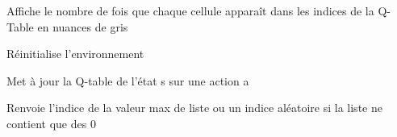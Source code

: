 \documentclass[letterpaper,10pt,french]{sphinxmanual}
\begin{document}
\begin{fulllineitems}
\begin{fulllineitems}
\label{\detokenize{index:qRL_optimizer.QRLOptimizer.printQIndexes}}
Affiche le nombre de fois que chaque cellule apparaît dans
les indices de la Q-Table en nuances de gris

\end{fulllineitems}


\begin{fulllineitems}
\label{\detokenize{index:qRL_optimizer.QRLOptimizer.reinit}}
Réinitialise l’environnement

\end{fulllineitems}


\begin{fulllineitems}
\label{\detokenize{index:qRL_optimizer.QRLOptimizer.update}}
Met à jour la Q-table de l’état s sur une action a

\end{fulllineitems}


\end{fulllineitems}


\begin{fulllineitems}
\label{\detokenize{index:qRL_optimizer.argmax}}
Renvoie l’indice de la valeur max de liste
ou un indice aléatoire si la liste ne contient que des 0

\end{fulllineitems}


\begin{fulllineitems}
\label{\detokenize{index:qRL_optimizer.getrandbits}}
\end{fulllineitems}

\end{document}
